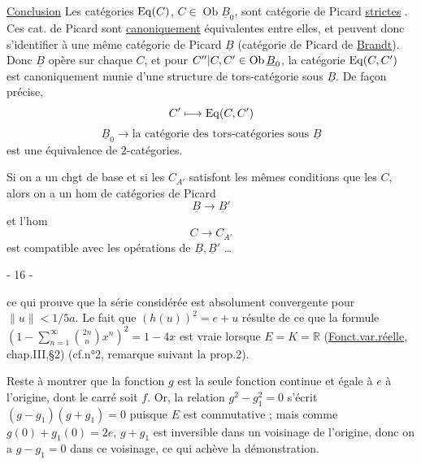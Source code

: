 \uline{Conclusion} Les catégories $\operatorname{Eq}(C)$,
$C\in\operatorname{Ob}\underline B_0$, sont
catégorie de Picard \uline{strictes}
.
Ces cat. de Picard sont \uline{canoniquement} équivalentes entre elles,
et peuvent donc s'identifier à une même catégorie de Picard
$\underline B$ (catégorie de Picard de \uline{Brandt}).
Donc $\underline B$ opère sur chaque $C$, et pour
$C''|C,C'\in\operatorname{Ob}\underline B_0$,
la catégorie 
$\operatorname{Eq}(C,C')$ est canoniquement munie d'une structure
de tors-catégorie sous $\underline B$. De façon précise,
\[
C'\longmapsto\operatorname{Eq}(C,C')
\]
\[
\underline B_0\longrightarrow
\text{la catégorie des tors-catégories sous }\underline B
\]
est une équivalence de $2$-catégories.

Si on a un chgt de base
et si les $C_{A'}$ satisfont les mêmes conditions que les $C$,
alors on a un hom de  catégories de Picard
\[
\underline B\longrightarrow\underline B'
\]
et l'hom 
\[
C\longrightarrow C_{A'}
\]
est compatible avec les opérations de $\underline B,\underline B'$ \ldots

\begin{center}
- 16 -
\end{center}

ce qui prouve que la série considérée est absolument convergente pour
$\|u\|<1/5a$. Le fait que $(h(u))^2=e+u$ résulte de ce que la formule
$(1-\sum_{n=1}^{\infty}\binom{2n}{n}x^n)^2=1-4x$ est vraie lorsque
$E=K=\mathbb R$ (\uline{Fonct.var.réelle}, chap.III,§2)
(cf.n°2, remarque suivant la prop.2).

Reste à montrer que la fonction $g$ est la seule fonction continue et égale
à $e$ à l'origine, dont le carré soit $f$. Or, la relation $g^2-g_1^2=0$
s'écrit $(g-g_1)(g+g_1)=0$ puisque $E$ est commutative ; mais comme
$g(0)+g_1(0)=2e$, $g+g_1$ est inversible dans un voisinage de l'origine,
donc on a $g-g_1=0$ dans ce voisinage, ce qui achève la démonstration.

